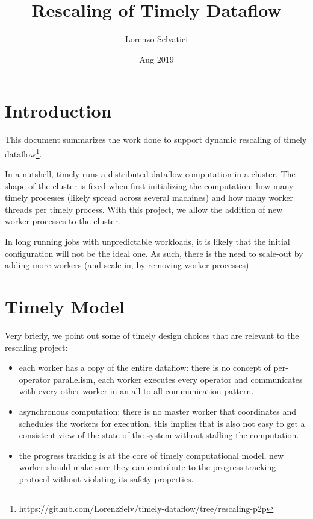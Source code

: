 \documentclass[12pt]{extarticle}
\title{Rescaling of Timely Dataflow}
\author{Lorenzo Selvatici}
\date{Aug 2019}
\begin{document}
\maketitle

\section{Introduction}

This document summarizes the work done to support dynamic rescaling of timely dataflow\footnote{https://github.com/LorenzSelv/timely-dataflow/tree/rescaling-p2p}.

In a nutshell, timely runs a distributed dataflow computation in a cluster. The shape of the cluster is fixed
when first initializing the computation: how many timely processes (likely spread across several machines) and how many worker threads per timely process.
With this project, we allow the addition of new worker processes to the cluster.

In long running jobs with unpredictable workloads, it is likely that the initial configuration will not be the ideal one.
As such, there is the need to scale-out by adding more workers (and scale-in, by removing worker processes).

\section{Timely Model}

Very briefly, we point out some of timely design choices that are relevant to the rescaling project:

\begin{itemize}
    \item each worker has a copy of the entire dataflow: there is no concept of per-operator parallelism, each worker executes
        every operator and communicates with every other worker in an all-to-all communication pattern.
    \item asynchronous computation: there is no master worker that coordinates and schedules the workers for execution, this implies
        that is also not easy to get a consistent view of the state of the system without stalling the computation.
    \item the progress tracking is at the core of timely computational model, new worker should make sure they
        can contribute to the progress tracking protocol without violating its safety properties.
\end{itemize}
\end{document}
